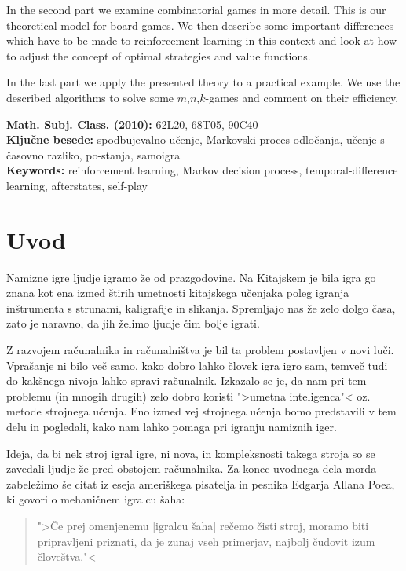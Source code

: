 \documentclass[12pt,a4paper]{amsart}
\theoremstyle{definition} %
\theoremstyle{plain} %
\begin{document}
In the second part we examine combinatorial games in more detail. This is our theoretical model for board 
games. We then describe some important differences which have to be made to reinforcement learning in 
this context and look at how to adjust the concept of optimal strategies and value functions.

In the last part we apply the presented theory to a practical example. We use the described algorithms to 
solve some $m$,$n$,$k$-games and comment on their efficiency.

\vfill\noindent
{\bf Math. Subj. Class. (2010):} 62L20, 68T05, 90C40  \\[1mm]  %
{\bf Ključne besede:} spodbujevalno učenje, Markovski proces odločanja, učenje s časovno razliko, 
                      po-stanja, samoigra \\[1mm]  
{\bf Keywords:} reinforcement learning, Markov decision process, temporal-difference learning,  
                afterstates, self-play
\pagebreak



\section{Uvod}
Namizne igre ljudje igramo že od prazgodovine. Na Kitajskem je bila igra go znana kot ena 
izmed štirih umetnosti kitajskega učenjaka poleg igranja inštrumenta s strunami, kaligrafije
in slikanja. Spremljajo nas že zelo dolgo časa, zato je naravno, da jih želimo ljudje čim
bolje igrati.

Z razvojem računalnika in računalništva je bil ta problem postavljen v novi luči. Vprašanje
ni bilo več samo, kako dobro lahko človek igra igro sam, temveč tudi do kakšnega nivoja 
lahko spravi računalnik. Izkazalo se je, da nam pri tem problemu (in mnogih drugih) zelo dobro
koristi ">umetna inteligenca"< oz. metode strojnega učenja. Eno izmed vej strojnega učenja bomo 
predstavili v tem delu in pogledali, kako nam lahko pomaga pri igranju namiznih iger.

Ideja, da bi nek stroj igral igre, ni nova, in kompleksnosti takega stroja so se zavedali ljudje
že pred obstojem računalnika. 
Za konec uvodnega dela morda zabeležimo še citat iz eseja ameriškega pisatelja in pesnika 
Edgarja Allana Poea, ki govori o mehaničnem igralcu šaha: 

\begin{quotation}
    ">Če prej omenjenemu [igralcu šaha] rečemo čisti stroj, moramo biti pripravljeni priznati, da je
    zunaj vseh primerjav, najbolj čudovit izum človeštva."<
\end{quotation}
\end{document}
